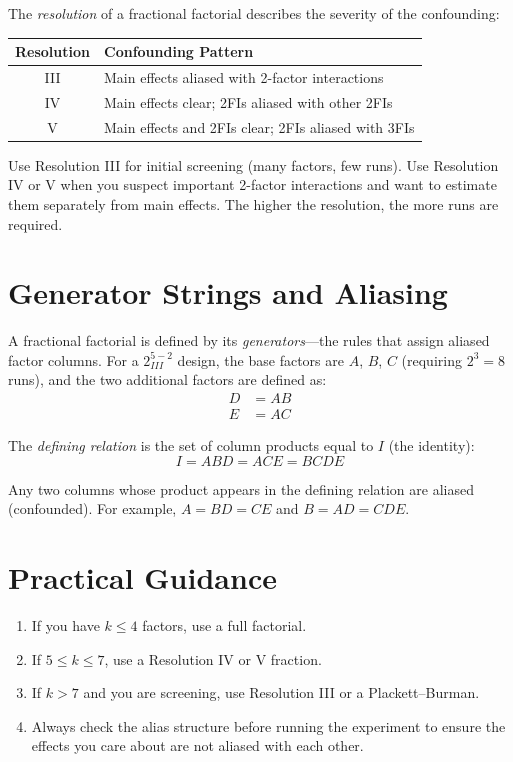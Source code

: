 \documentclass[11pt]{book}
\begin{document}
The \emph{resolution} of a fractional factorial describes the severity of the
confounding:

\begin{center}
\begin{tabular}{cl}
\toprule
Resolution & Confounding Pattern \\
\midrule
III & Main effects aliased with 2-factor interactions \\
IV & Main effects clear; 2FIs aliased with other 2FIs \\
V & Main effects and 2FIs clear; 2FIs aliased with 3FIs \\
\bottomrule
\end{tabular}
\end{center}

\begin{keypoint}
Use Resolution III for initial screening (many factors, few runs). Use
Resolution IV or V when you suspect important 2-factor interactions and want
to estimate them separately from main effects. The higher the resolution, the
more runs are required.
\end{keypoint}

\section{Generator Strings and Aliasing}

A fractional factorial is defined by its \emph{generators}---the rules that
assign aliased factor columns. For a $2^{5-2}_{III}$ design, the base factors
are $A$, $B$, $C$ (requiring $2^3 = 8$ runs), and the two additional factors
are defined as:
\begin{align*}
D &= AB \\
E &= AC
\end{align*}

The \emph{defining relation} is the set of column products equal to $I$ (the
identity):
\[
I = ABD = ACE = BCDE
\]

Any two columns whose product appears in the defining relation are aliased
(confounded). For example, $A = BD = CE$ and $B = AD = CDE$.

\section{Practical Guidance}

\begin{enumerate}[nosep]
\item If you have $k \leq 4$ factors, use a full factorial.
\item If $5 \leq k \leq 7$, use a Resolution IV or V fraction.
\item If $k > 7$ and you are screening, use Resolution III or a Plackett--Burman.
\item Always check the alias structure before running the experiment to ensure
      the effects you care about are not aliased with each other.
\end{enumerate}
\end{document}
